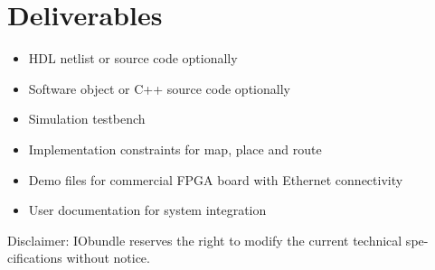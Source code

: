 \documentclass[twocolumn]{iob_pb}
\begin{document}
\section*{\textcolor[rgb]{0,0,0}{Deliverables}}
\begin{itemize}
\item HDL netlist or source code optionally
\item Software object or C++ source code optionally
\item Simulation testbench
\item Implementation constraints for map, place and route
\item Demo files for commercial FPGA board with Ethernet connectivity
\item User documentation for system integration
\end{itemize}

\vspace*{0.5cm}
\noindent
\begin{scriptsize}
Disclaimer: IObundle reserves the right to modify the current
technical spe-cifications without notice.
\end{scriptsize}
\end{document}
